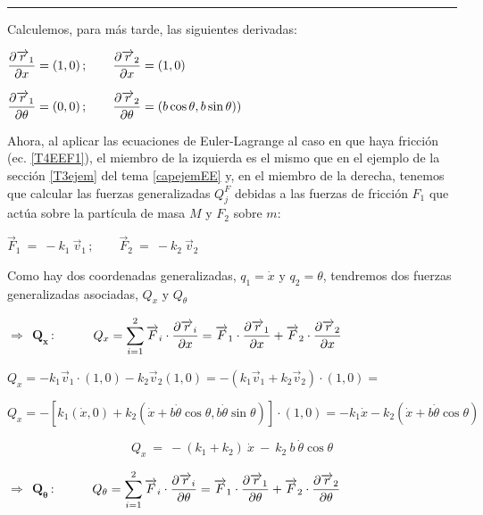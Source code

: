 \begin{flushright}
\rule{200pt}{0.1pt}	
\end{flushright}

Calculemos, para más tarde, las siguientes derivadas:

$\displaystyle \pdv{\overrightarrow r_1}{x}=(1,0)\, ; \qquad \pdv{\overrightarrow r_2}{x}=(1,0)$

$\displaystyle \pdv{\overrightarrow r_1}{\theta}=(0,0)\, ; \qquad \pdv{\overrightarrow r_2}{\theta}=(b\cos \theta, b \sin \theta))$

\vspace{0.5cm}
Ahora, al aplicar las ecuaciones de Euler-Lagrange al caso en que haya fricción (ec. \ref{T4EEF1}), el miembro de la izquierda es el mismo que en el ejemplo de la sección \ref{T3ejem} del tema \ref{capejemEE} y, en el miembro de la derecha, tenemos que calcular las fuerzas generalizadas $Q^F_j$ debidas a las fuerzas de fricción $F_1$ que actúa sobre la partícula de masa $M$ y $F_2$ sobre $m$:

$\overrightarrow F_1 \ = \ - k_1\ \overrightarrow v_1 \, ; \qquad 
\overrightarrow F_2 \ = \ - k_2 \ \overrightarrow v_2$

Como hay dos coordenadas generalizadas, $q_1=\dot x \text{ y } q_2=\theta$, tendremos dos fuerzas generalizadas asociadas, $Q_x \text{ y } Q_{\theta}$

$\boxed{ \Rightarrow \  \ \boldsymbol {Q_x} \, : \ }$
$\qquad$
$Q_x=\displaystyle \sum_{i=1}^{2} \overrightarrow F_i \cdot \pdv{\overrightarrow r_i}{x} = 
\overrightarrow F_1 \cdot \pdv{\overrightarrow r_1}{x}+
\overrightarrow F_2 \cdot \pdv{\overrightarrow r_2}{x}$

$Q_x=-k_1\overrightarrow v_1 \cdot (1,0) - k_2 \overrightarrow v_2 (1,0)=-(k_1\overrightarrow v_1+k_2 \overrightarrow v_2) \cdot (1,0)=$

$Q_x=-[k_1(\dot x,0)+k_2(\dot x+b\dot \theta \cos \theta, b \dot \theta \sin \theta)]\cdot (1,0)=-k_1 \dot x - k_2(\dot x+b\dot \theta \cos \theta)$


\begin{equation}
Q_x \ = \ -(k_1+k_2) \ \dot x \ - \  k_2 \ b \ \dot \theta \cos \theta	
\end{equation}



$\boxed{\Rightarrow \  \ \boldsymbol {Q_{\theta}} \, : \ }$
$\qquad$
$Q_{\theta}=\displaystyle \sum_{i=1}^{2} \overrightarrow F_i \cdot \pdv{\overrightarrow r_i}{{\theta}} = 
\overrightarrow F_1 \cdot \pdv{\overrightarrow r_1}{{\theta}}+
\overrightarrow F_2 \cdot \pdv{\overrightarrow r_2}{{\theta}}$

